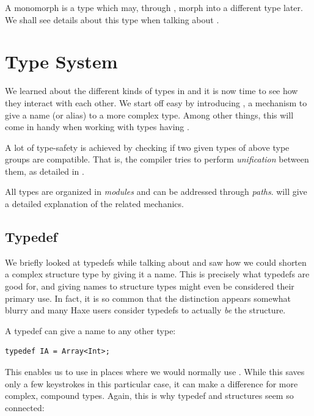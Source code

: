 \documentclass{haxe}
\begin{document}
A monomorph is a type which may, through , morph into a different type later. We shall see details about this type when talking about .




\chapter{Type System}
\label{type-system}

We learned about the different kinds of types in  and it is now time to see how they interact with each other. We start off easy by introducing , a mechanism to give a name (or alias) to a more complex type. Among other things, this will come in handy when working with types having .

A lot of type-safety is achieved by checking if two given types of above type groups are compatible. That is, the compiler tries to perform \emph{unification} between them, as detailed in .

All types are organized in \emph{modules} and can be addressed through \emph{paths}.  will give a detailed explanation of the related mechanics.

\section{Typedef}
\label{type-system-typedef}

We briefly looked at typedefs while talking about  and saw how we could shorten a complex structure type by giving it a name. This is precisely what typedefs are good for, and giving names to structure types might even be considered their primary use. In fact, it is so common that the distinction appears somewhat blurry and many Haxe users consider typedefs to actually \emph{be} the structure.

A typedef can give a name to any other type:

\begin{lstlisting}
typedef IA = Array<Int>;
\end{lstlisting}
This enables us to use  in places where we would normally use . While this saves only a few keystrokes in this particular case, it can make a difference for more complex, compound types. Again, this is why typedef and structures seem so connected:
\end{document}

